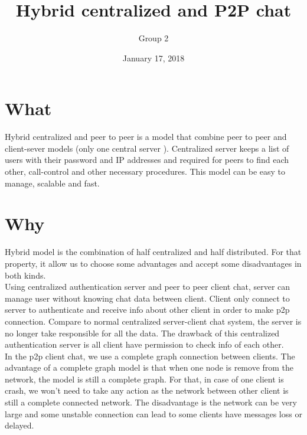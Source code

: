 \documentclass[12pt]{article}
\title{Hybrid centralized and P2P chat}
\author{Group 2}
\date{January 17, 2018}
\begin{document}
\maketitle
  \section{What}
     Hybrid centralized and peer to peer is a model that combine peer to peer and client-sever models (only one central server ). Centralized server keeps a list of users with their password and IP addresses and required for peers to find each other, call-control and other necessary procedures. This model can be easy to manage, scalable and fast.

    \section{Why}
    Hybrid model is the combination of half centralized and half distributed. For that property, it allow us to choose some advantages and accept some disadvantages in both kinds.\\ 
Using centralized authentication server and peer to peer client chat, server can manage user without knowing chat data between client. Client only connect to server to authenticate and receive info about other client in order to make p2p connection. Compare to normal centralized server-client chat system, the server is no longer take responsible for all the data. The drawback of this centralized authentication server is all client have permission to check info of each other.\\ 
In the p2p client chat, we use a complete graph connection between clients. The advantage of a complete graph model is that when one node is remove from the network, the model is still a complete graph. For that, in case of one client is crash, we won’t need to take any action as the network between other client is still a complete connected network. The disadvantage is the network can be very large and some unstable connection can lead to some clients have messages loss or delayed.
\end{document}
